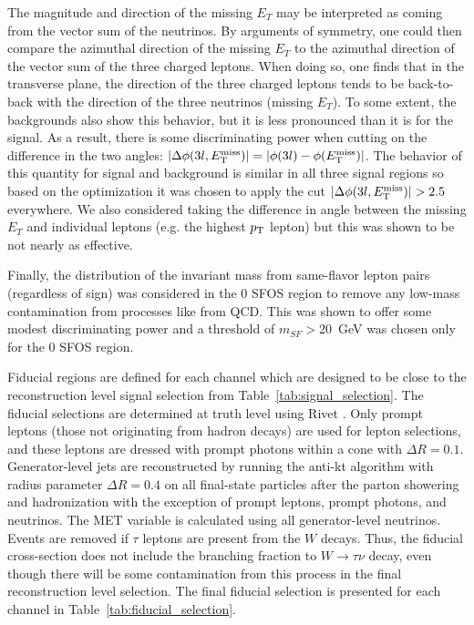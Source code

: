 The magnitude and direction
of the missing $E_{T}$ may be interpreted as coming from the 
vector sum of the neutrinos.  By arguments of 
symmetry, one could then compare the azimuthal direction 
of the missing $E_{T}$ to the azimuthal direction of the vector
sum of the three charged leptons. When doing so, one finds that 
in the transverse plane, 
the direction of the three charged leptons
tends to be back-to-back with the direction of the 
three neutrinos (missing $E_{T}$). To some extent, the
backgrounds also show this behavior, but it is less pronounced than 
it is for the signal.  As a result, 
there is some discriminating power when cutting on the difference 
in the two angles: 
$|\Delta\phi(3l,E_{\mathrm{T}}^{\mathrm{miss}})| = |\phi(3l)-\phi(E_{\mathrm{T}}^{\mathrm{miss}})|$. 
The behavior of this quantity for signal and
background is similar in all three signal regions so based on the 
optimization it was chosen to apply the cut
$|\Delta\phi(3l,E_{\mathrm{T}}^{\mathrm{miss}})| > 2.5$ everywhere.  
We also considered taking the difference in angle between
the missing $E_{T}$ and individual leptons (e.g. the highest $p_{\mathrm{T}}$ lepton) 
but this was shown to be not nearly as effective.  

Finally, the distribution of the invariant mass
from same-flavor lepton pairs (regardless of sign) 
was considered in the 0 SFOS 
region to remove any low-mass contamination from processes like from QCD.  
This was shown to offer some
modest discriminating power and a threshold of $m_{SF} > 20$~GeV 
was chosen only for the 0 SFOS region.


Fiducial regions are defined  for each channel which are designed to 
be close to the reconstruction
level signal selection from Table~\ref{tab:signal_selection}.  
The fiducial selections are determined at truth level using 
Rivet \cite{Buckley:2010ar}.
Only prompt leptons (those not originating from hadron decays) are used for 
lepton selections, and these leptons are dressed with prompt photons within a 
cone with $\Delta R = 0.1$. Generator-level jets are reconstructed by running the 
anti-kt algorithm with radius parameter $\Delta R = 0.4$ on all final-state particles 
after the parton showering and hadronization with the exception of prompt 
leptons, prompt photons, and neutrinos. The MET variable is calculated using all 
generator-level neutrinos. 
Events are removed if $\tau$ leptons are present from the $W$ decays.  
Thus, the fiducial cross-section
does not include the branching fraction to $W\rightarrow\tau\nu$ decay, 
even though there will be some contamination from this process in the final 
reconstruction level selection. The final fiducial selection is presented
for each channel in Table~\ref{tab:fiducial_selection}.

